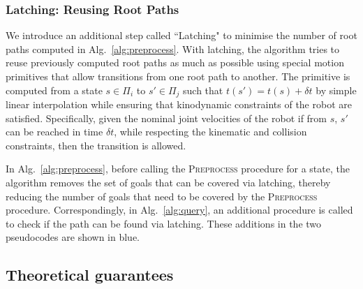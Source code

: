 \documentclass[conference]{IEEEtran}
\begin{document}
%

\subsubsection{Latching: Reusing Root Paths}
\label{latching}
We introduce an additional step called ``Latching" to minimise the number of root paths computed in Alg.~\ref{alg:preprocess}. With latching, the algorithm tries to reuse previously computed root paths as much as possible using special motion primitives that allow transitions from one root path to another.
The primitive is computed from a state $s \in \Pi_i$ to $s' \in \Pi_j$ such that $t(s') = t(s) + \delta t$ by simple linear interpolation while ensuring that kinodynamic constraints of the robot are satisfied. Specifically, given the nominal joint velocities of the robot if from $s$, $s'$ can be reached in time $\delta t$, while respecting the kinematic and collision constraints, then the transition is allowed.

In Alg.~\ref{alg:preprocess}, before calling the \textsc{Preprocess} procedure for a state, the algorithm removes the set of goals that can be covered via latching, thereby reducing the number of goals that need to be covered by the \textsc{Preprocess} procedure. Correspondingly, in Alg.~\ref{alg:query}, an additional procedure is called to check if the path can be found via latching. These additions in the two pseudocodes are shown in blue.

\subsection{Theoretical guarantees}
\end{document}
